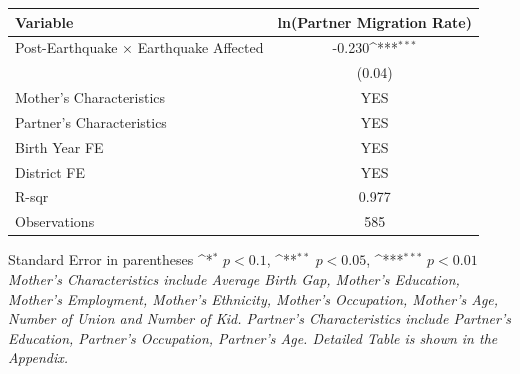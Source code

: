 \def\sym#1{\ifmmode^{#1}\else\(^{#1}\)\fi}
\renewcommand{\arraystretch}{1.4}
\small
\setlength{\tabcolsep}{8pt}

\begin{flushleft}
\begin{tabular}{@{}p{11cm}c@{}}
\hline\hline
Variable & ln(Partner Migration Rate) \\
\hline
Post-Earthquake × Earthquake Affected & -0.230\sym{***} \\
                                      & (0.04) \\
\hline
Mother's Characteristics              & YES \\
Partner's Characteristics             & YES \\
\hline
Birth Year FE                         & YES \\
District FE                           & YES \\
R-sqr                                 & 0.977 \\
Observations                          & 585 \\
\hline\hline
\end{tabular}

\vspace{4pt}
\noindent\footnotesize
Standard Error in parentheses \sym{*} \(p<0.1\), \sym{**} \(p<0.05\), \sym{***} \(p<0.01\)\\
\textit{Mother’s Characteristics include Average Birth Gap, Mother’s Education, Mother’s Employment, Mother’s Ethnicity, Mother’s Occupation, Mother’s Age, Number of Union and Number of Kid. Partner’s Characteristics include Partner’s Education, Partner’s Occupation, Partner’s Age. Detailed Table is shown in the Appendix.}
\end{flushleft}
